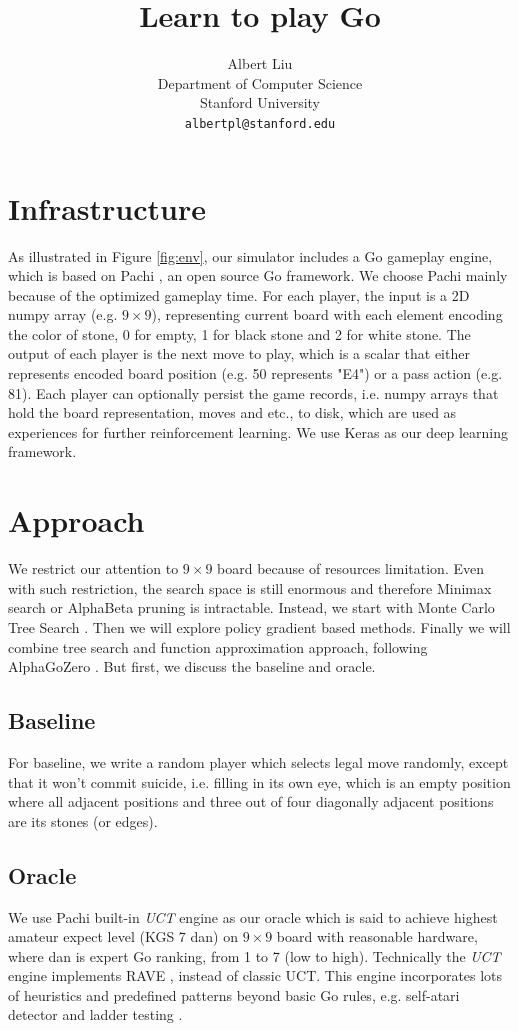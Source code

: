 \documentclass{article}
\title{Learn to play Go}
\author{%
  Albert Liu \\
  Department of Computer Science\\
  Stanford University\\
  \texttt{albertpl@stanford.edu} \\
}
\begin{document}
\maketitle

\section{Infrastructure}
As illustrated in Figure \ref{fig:env}, our simulator includes a Go gameplay engine, which is based on Pachi \cite{baudivs2011pachi}, an open source Go framework. We choose Pachi mainly because of the optimized gameplay time. For each player, the input is a 2D numpy array (e.g. $9 \times 9$), representing current board with each element encoding the color of stone, 0 for empty, 1 for black stone and 2 for white stone. The output of each player is the next move to play, which is a scalar that either represents encoded board position (e.g. 50 represents "E4") or a pass action (e.g. 81). Each player can optionally persist the game records, i.e. numpy arrays that hold the board representation, moves and etc., to disk, which are used as experiences for further reinforcement learning. We use Keras as our deep learning framework. 

\section{Approach}
We restrict our attention to $9 \times 9$ board because of resources limitation. Even with such restriction,  the search space is still enormous and therefore Minimax search or AlphaBeta pruning is intractable. Instead, we start with Monte Carlo Tree Search \cite{coulom2006efficient}. Then we will explore policy gradient based methods. Finally we will combine tree search and function approximation approach, following AlphaGoZero \cite{silver2017masteringalphagozero}.  But first, we discuss the baseline and oracle.

\subsection{Baseline}
For baseline, we write a random player which selects legal move randomly, except that it won't commit suicide, i.e. filling in its own eye, which is an empty position where all adjacent positions and three out of four diagonally adjacent positions are its stones (or edges).

\subsection{Oracle}
We use Pachi built-in \textit{UCT} engine as our oracle which is said to achieve highest amateur expect level (KGS 7 dan) on $9 \times 9$ board with reasonable hardware, where dan is expert Go ranking, from 1 to 7 (low to high). Technically the \textit{UCT} engine implements RAVE \cite{gelly2007combining}, instead of classic UCT. This engine incorporates lots of heuristics and predefined patterns beyond basic Go rules, e.g. self-atari detector and ladder testing \cite{baudivs2011pachi}.
\end{document}

